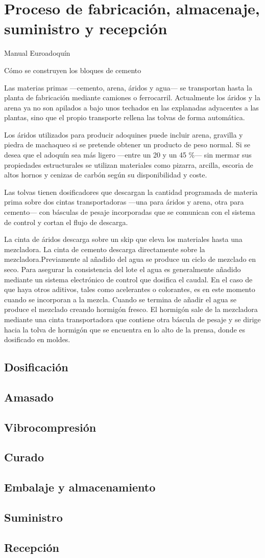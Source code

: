 \chapter{Proceso de fabricación, almacenaje, suministro y recepción}
Manual Euroadoquín

Cómo se construyen los bloques de cemento

Las materias primas —cemento, arena, áridos y agua— se transportan hasta la planta de fabricación mediante camiones o ferrocarril. Actualmente los áridos y la arena ya no son apilados a bajo unos techados en las explanadas adyacentes a las plantas, sino que el propio transporte rellena las tolvas de forma automática.

Los áridos utilizados para producir adoquines puede incluir arena, gravilla y piedra de machaqueo si se pretende obtener un producto de peso normal. Si se desea que el adoquín sea más ligero —entre un 20 y un 45 \%— sin mermar sus propiedades estructurales se utilizan materiales como pizarra, arcilla, escoria de altos hornos y cenizas de carbón según su disponibilidad y coste.

Las tolvas tienen dosificadores que descargan la cantidad programada de materia prima sobre dos cintas transportadoras —una para áridos y arena, otra para cemento— con básculas de pesaje incorporadas que se comunican con el sistema de control y cortan el flujo de descarga.

La cinta de áridos descarga sobre un skip que eleva los materiales hasta una mezcladora. La cinta de cemento descarga directamente sobre la mezcladora.Previamente al añadido del agua se produce un ciclo de mezclado en seco. Para asegurar la consistencia del lote el agua es generalmente añadido mediante un sistema electrónico de control que dosifica el caudal. En el caso de que haya otros aditivos, tales como acelerantes o colorantes, es en este momento cuando se incorporan a la mezcla. Cuando se termina de añadir el agua se produce el mezclado creando hormigón fresco. El hormigón sale de la mezcladora mediante una cinta transportadora que contiene otra báscula de pesaje y se dirige hacia la tolva de hormigón que se encuentra en lo alto de la prensa, donde es dosificado en moldes.



\section{Dosificación}
\section{Amasado}
\section{Vibrocompresión}
\section{Curado}
\section{Embalaje y almacenamiento}
\section{Suministro}
\section{Recepción}
